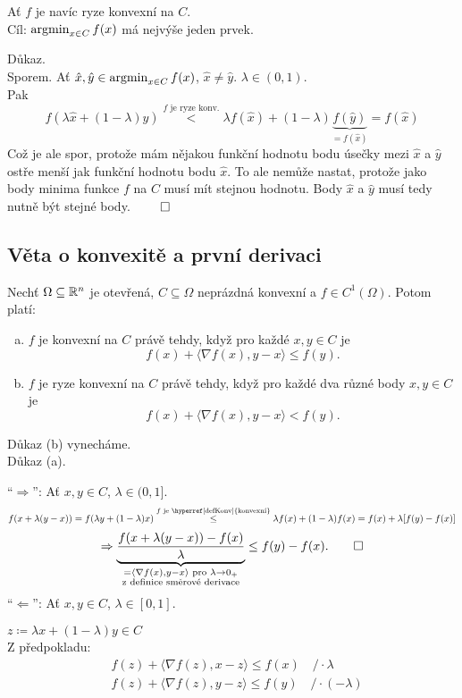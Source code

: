 Ať $f$ je navíc ryze konvexní na $C$.\\
Cíl: $\operatorname*{argmin}_{x \in C} f(x)$ má nejvýše jeden prvek.

Důkaz.\\
Sporem. Ať $\hat x, \hat y \in \operatorname*{argmin}_{x \in C} f(x)$, $\hat x \not=\hat y$. $\lambda \in (0,1)$.\\
Pak
\[
    f(\lambda \hat x  + (1-\lambda) \hat y) \overset{f \text{ je ryze konv.}}{<} \lambda f(\hat x) + (1-\lambda) 
    \underbrace{f(\hat y)}_{= f(\hat x)} = f(\hat x)
\]
Což je ale spor, protože mám nějakou funkční hodnotu bodu úsečky mezi $\hat x$ a $\hat y$ ostře menší jak funkční 
hodnotu bodu $\hat x$. To ale nemůže nastat, protože jako body minima funkce $f$ na $C$ musí mít stejnou hodnotu. Body
$\hat x$ a $\hat y$ musí tedy nutně být stejné body. $\qed$

\subsection{Věta o konvexitě a první derivaci}\label{konvDeriv} %
Nechť $\Omega \subseteq \mathbb{R}^n$ je otevřená, $C \subseteq \Omega$ neprázdná konvexní a $f \in C^{1} (\Omega)$. Potom platí:
\begin{enumerate}[(a)]
    \item $f$ je konvexní na $C$ právě tehdy, když pro každé $x, y \in C$ je
    \[
        f(x) + \langle \nabla f(x), y-x\rangle \leq f(y).
    \]
    \item $f$ je ryze konvexní na $C$ právě tehdy, když pro každé dva různé body $x, y \in C$ je 
    \[
        f(x) + \langle \nabla f(x), y-x\rangle < f(y).
    \]
\end{enumerate}
Důkaz (b) vynecháme.
\\

Důkaz (a).

\enquote{$\Rightarrow$}: Ať $x, y \in C$, $\lambda \in (0,1]$.
\[
    f(x + \lambda (y-x)) = f(\lambda y + (1-\lambda)x) \overset{f \text{ je \hyperref[defKonv]{konvexní}}}{\leq} 
    \lambda f(x) + (1 - \lambda)f(x) = f(x) + \lambda [f(y) - f(x)]
\]
\[
    \Rightarrow \underbrace {\frac {f(x + \lambda (y-x)) - f(x)}{\lambda}}_{\substack{{ = \langle \nabla f(x), 
    y-x\rangle \text{ pro } \lambda \rightarrow 0_+}\\{\text{z definice směrové derivace}}}} \leq f(y) - f(x). \qed
\]
\enquote{$\Leftarrow$}: Ať $x, y \in C$, $\lambda \in [0,1]$.

$z \coloneq \lambda x + (1-\lambda) y \in C$\\
Z předpokladu:
\begin{align}
    & f(z) + \langle \nabla f(z), x - z\rangle \leq f(x) \quad / \cdot \lambda \\
    & f(z) + \langle \nabla f(z), y - z\rangle \leq f(y) \quad / \cdot (- \lambda)
\end{align}

